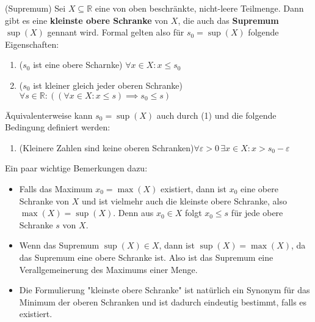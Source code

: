 \documentclass[../Analysis1_script.tex]{subfiles}
\begin{document}
\begin{proposition}{(Supremum)}
	Sei $X \subseteq \mathbb{R}$ eine von oben beschränkte, nicht-leere Teilmenge. Dann gibt es eine \textbf{kleinste obere Schranke} von $X$, die auch das \textbf{Supremum} $\sup (X)$ gennant wird. Formal gelten also für $s_0 = \sup(X)$ folgende Eigenschaften:
	\begin{enumerate}
		\item{($s_0$ ist eine obere Scharnke)} $\forall x \in X : x \leq s_0$
		\item{($s_0$ ist kleiner gleich jeder oberen Schranke)} $\forall s \in \mathbb{R}: ((\forall x \in X: x \leq s) \implies s_0 \leq s)$
	\end{enumerate} 
	Äquivalenterweise kann $s_0 = \sup(X)$ auch durch (1) und die folgende Bedingung definiert werden:
	\begin{enumerate}[resume]
		\item{(Kleinere Zahlen sind keine oberen Schranken)}$\forall \varepsilon > 0 \,\exists x \in X : x > s_0 - \varepsilon$
	\end{enumerate}
	
	Ein paar wichtige Bemerkungen dazu:
	\begin{itemize}
		\item Falls das Maximum $x_0 = \max(X)$ existiert, dann ist $x_0$ eine obere Schranke von $X$ und ist vielmehr auch die kleinste obere Schranke, also $\max(X) = \sup(X)$. Denn aus $x_0 \in X$ folgt $x_0 \leq s$ für jede obere Schranke $s$ von $X$.
		\item Wenn das Supremum $\sup(X) \in X$, dann ist $\sup(X) = \max(X)$, da das Supremum eine obere Schranke ist. Also ist das Supremum eine  Verallgemeinerung des Maximums einer Menge.
		\item Die Formulierung "kleinste obere Schranke" ist natürlich ein Synonym für das Minimum der oberen Schranken und ist dadurch eindeutig bestimmt, falls es existiert.
	\end{itemize}
\end{proposition}
\end{document}
